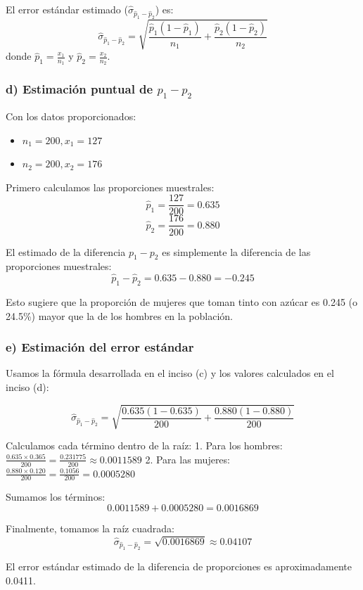 \documentclass[12pt]{article}
\begin{document}
El error estándar estimado ($\hat{\sigma}_{\hat{p}_1 - \hat{p}_2}$) es:
$$ \hat{\sigma}_{\hat{p}_1 - \hat{p}_2} = \sqrt{\frac{\hat{p}_1 (1 - \hat{p}_1)}{n_1} + \frac{\hat{p}_2 (1 - \hat{p}_2)}{n_2}} $$
donde $\hat{p}_1 = \frac{x_1}{n_1}$ y $\hat{p}_2 = \frac{x_2}{n_2}$.

\subsubsection*{d) Estimación puntual de $p_1 - p_2$}

Con los datos proporcionados:
\begin{itemize}
    \item $n_1 = 200, x_1 = 127$
    \item $n_2 = 200, x_2 = 176$
\end{itemize}

Primero calculamos las proporciones muestrales:
$$ \hat{p}_1 = \frac{127}{200} = 0.635 $$
$$ \hat{p}_2 = \frac{176}{200} = 0.880 $$

El estimado de la diferencia $p_1 - p_2$ es simplemente la diferencia de las proporciones muestrales:
$$ \hat{p}_1 - \hat{p}_2 = 0.635 - 0.880 = -0.245 $$

Esto sugiere que la proporción de mujeres que toman tinto con azúcar es 0.245 (o 24.5\%) mayor que la de los hombres en la población.

\subsubsection*{e) Estimación del error estándar}

Usamos la fórmula desarrollada en el inciso (c) y los valores calculados en el inciso (d):

$$ \hat{\sigma}_{\hat{p}_1 - \hat{p}_2} = \sqrt{\frac{0.635 (1 - 0.635)}{200} + \frac{0.880 (1 - 0.880)}{200}} $$

Calculamos cada término dentro de la raíz:
1.  Para los hombres: $\frac{0.635 \times 0.365}{200} = \frac{0.231775}{200} \approx 0.0011589$
2.  Para las mujeres: $\frac{0.880 \times 0.120}{200} = \frac{0.1056}{200} = 0.0005280$

Sumamos los términos:
$$ 0.0011589 + 0.0005280 = 0.0016869 $$

Finalmente, tomamos la raíz cuadrada:
$$ \hat{\sigma}_{\hat{p}_1 - \hat{p}_2} = \sqrt{0.0016869} \approx 0.04107 $$

El error estándar estimado de la diferencia de proporciones es aproximadamente 0.0411.
\end{document}
